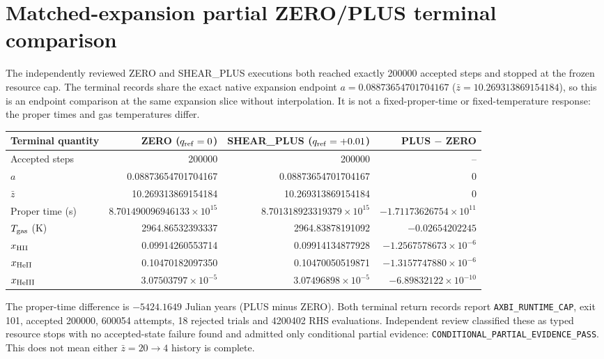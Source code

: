 \documentclass[11pt]{article}
\begin{document}
\section{Matched-expansion partial ZERO/PLUS terminal comparison}
The independently reviewed ZERO and SHEAR\_PLUS executions both reached exactly 200000 accepted steps and stopped at the frozen resource cap. The terminal records share the exact native expansion endpoint $a=0.08873654701704167$ ($\bar z=10.269313869154184$), so this is an endpoint comparison at the same expansion slice without interpolation. It is not a fixed-proper-time or fixed-temperature response: the proper times and gas temperatures differ.

\begin{center}
\begin{tabular}{lrrr}\toprule
Terminal quantity & ZERO ($q_{\rm ref}=0$) & SHEAR\_PLUS ($q_{\rm ref}=+0.01$) & PLUS $-$ ZERO\\\midrule
Accepted steps & 200000 & 200000 & --\\
$a$ & 0.08873654701704167 & 0.08873654701704167 & 0\\
$\bar z$ & 10.269313869154184 & 10.269313869154184 & 0\\
Proper time (s) & $8.701490096946133\times10^{15}$ & $8.701318923319379\times10^{15}$ & $-1.71173626754\times10^{11}$\\
$T_{\rm gas}$ (K) & 2964.86532393337 & 2964.83878191092 & $-0.02654202245$\\
$x_{\rm HII}$ & 0.09914260553714 & 0.09914134877928 & $-1.2567578673\times10^{-6}$\\
$x_{\rm HeII}$ & 0.10470182097350 & 0.10470050519871 & $-1.3157747880\times10^{-6}$\\
$x_{\rm HeIII}$ & $3.07503797\times10^{-5}$ & $3.07496898\times10^{-5}$ & $-6.89832122\times10^{-10}$\\
\bottomrule
\end{tabular}
\end{center}

The proper-time difference is $-5424.1649$ Julian years (PLUS minus ZERO). Both terminal return records report \texttt{AXBI\_RUNTIME\_CAP}, exit 101, accepted 200000, 600054 attempts, 18 rejected trials and 4200402 RHS evaluations. Independent review classified these as typed resource stops with no accepted-state failure found and admitted only conditional partial evidence: \texttt{CONDITIONAL\_PARTIAL\_EVIDENCE\_PASS}. This does not mean either $\bar z=20\to4$ history is complete.
\end{document}
